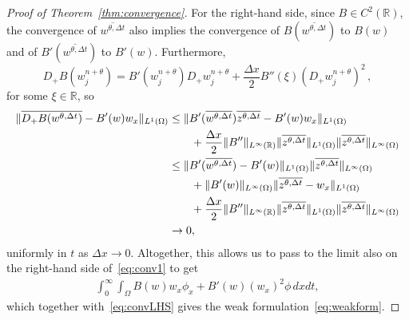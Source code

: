 \documentclass[11pt,leqno]{amsart}
\newcommand{\R}{\mathbb{R}}
\newcommand{\px}[1]{#1_x }
\newcommand{\Dtp}{D_t^+}
\newcommand{\Dp}{D_+}
\newcommand{\Dm}{D_-}
\newcommand{\normLinf}[1]{\norm{#1}_{L^\infty(\Omega)}}
\newcommand{\normLinft}[1]{\norm{#1}_{L^\infty(\Omega\times (0,\infty))}}
\newcommand{\normLinfR}[1]{\norm{#1}_{L^\infty(\R)}}
\newcommand{\normLone}[1]{\norm{#1}_{L^1(\Omega)}}
\newcommand{\wthcon}{\overline{w^{\theta,\Delta t}}}
\newcommand{\zthcon}{\overline{z^{\theta,\Delta t}}}
\renewcommand{\H}{H}
\DeclarePairedDelimiter\norm{\lVert}{\rVert}
\begin{document}
\begin{proof}[Proof of Theorem~\ref{thm:convergence}]
For the right-hand side, since $B\in C^2(\R)$, the convergence of $\wthcon$ also implies the convergence of $B(\wthcon)$ to $B(w)$ and of $B'(\wthcon)$ to $B'(w)$. Furthermore,
\begin{equation*}
  \Dp B(w^{n+\theta}_j)= B'(w^{n+\theta}_j) \Dp w^{n+\theta}_j + \frac{\Delta x}{2} B''(\xi) (\Dp w^{n+\theta}_j)^2\,,
\end{equation*}
for some $\xi\in\R$, so
\begin{align*}
\normLone{\overline{\Dp B(w^{\theta,\Delta t})}-B'(w) \px{w}}&\le \normLone{B'(\wthcon)\zthcon - B'(w)\px{w}}\\&\qquad {}+ \frac{\Delta x}{2} \normLinfR{B''}\normLone{\zthcon}\normLinf{\zthcon}\\
&\le \normLone{B'(\wthcon)-B'(w)}\normLinf{\zthcon} \\&\qquad {}+ \normLinf{B'(w)}\normLone{\zthcon-\px{w}}\\ &\qquad+  \frac{\Delta x}{2} \normLinfR{B''}\normLone{\zthcon}\normLinf{\zthcon}\\
&\rightarrow 0,
\end{align*}
uniformly in $t$ as $\Delta x\rightarrow 0$.
Altogether, this allows us to pass to the limit also on the right-hand side of~\eqref{eq:conv1} to get
\begin{align*}
  \int_0^\infty \int_\Omega B(w) \px{w} \px{\phi} + B'(w) (\px{w})^2 \phi\,dxdt,
\end{align*}
which together with~\eqref{eq:convLHS} gives the weak formulation~\eqref{eq:weakform}.

\end{proof}
\end{document}
